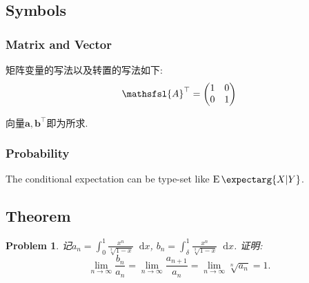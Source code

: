 \documentclass[a4paper, 12pt]{ctexart}
\theoremstyle{plain}
\newtheorem{problem}{Problem}[section]
\theoremstyle{plain}
\theoremstyle{plain}
\theoremstyle{nonumberplain}
\newcommand{\expect}{\operatorname{E}\expectarg}
\newcommand*{\diff}{\mathop{}\!\mathrm{d}}
\newcommand*{\matr}[1]{\ensuremath{\mathsfsl{#1}}} %
\newcommand*{\vect}[1]{\bm{#1}}
\begin{document}
    \subsection{Symbols}

    \subsubsection{Matrix and Vector}

    矩阵变量的写法以及转置的写法如下:
    \begin{equation}
        \matr{A}^{\top} =
        \begin{pmatrix}
            1 & 0\\
            0 & 1
        \end{pmatrix}
    \end{equation}

    向量$\vect{a}, \vect{b}^{\top}$即为所求.

    \subsubsection{Probability}

    The conditional expectation can be type-set like $\expect{X|Y}$.

    \subsection{Theorem}

    \begin{problem}
        记$\displaystyle a_n=\int_{0}^{1}{\frac{x^n}{\sqrt[3]{1-x}}\diff x}$,
        $\displaystyle b_n=\int_{\delta}^{1}{\frac{x^n}{\sqrt[3]{1-x}}\diff x}$.
        证明:
        \[\lim_{n\to \infty}{\frac{b_n}{a_n}}=
        \lim_{n\to \infty}{\frac{a_{n+1}}{a_n}}=
        \lim_{n\to \infty}{\sqrt[n]{a_n}}=1.\]
    \end{problem}
\end{document}
